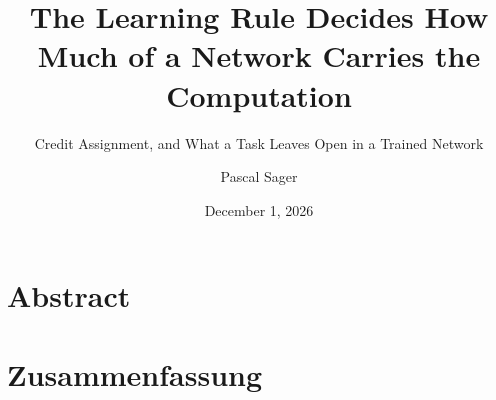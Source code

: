 \documentclass[
	fontsize=10pt, %
	twoside=true, %
	secnumdepth=3, %
	numbers=noenddot, %
]{kaobook}
\begin{document}
\frontmatter %

%




\subject{Doctoral Dissertation}
\newcommand{\thesistitle}{The Learning Rule Decides How Much of a Network Carries the Computation}
\title[\thesistitle]{\thesistitle}
\subtitle{Credit Assignment, and What a Task Leaves Open in a Trained Network}

\author[Pascal Sager]{Pascal Sager}
\date{December 1, 2026}
\publishers{University of Zurich}


\chapter*{Abstract}


\chapter*{Zusammenfassung}


\end{document}
